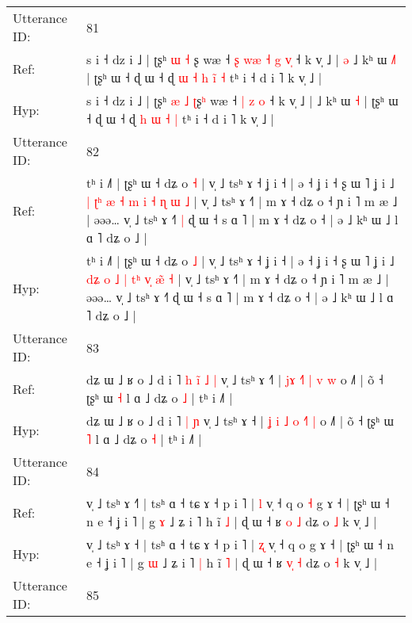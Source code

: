 \documentclass[10pt]{article}
\DeclareRobustCommand{\hl}[1]{{\textcolor{red}{#1}}}
\begin{document}
\begin{longtable}{ll}
 \\
\midrule
Utterance ID: & 81 \\
Ref: & s i ˧ dz i ˩ | ʈʂʰ \hl{ɯ} \hl{˧} \hl{}ʂ\hl{} wæ ˧\hl{ }\hl{ʂ}\hl{ }\hl{w}\hl{æ} \hl{˧} \hl{g} \hl{v}\hl{̩} ˧ k v̩ ˩ |\hl{ }\hl{ə} ˩ kʰ ɯ \hl{˩}\hl{˥} | ʈʂʰ ɯ ˧ ɖ ɯ ˧ ɖ\hl{ }\hl{ɯ} \hl{˧} \hl{h} \hl{i}\hl{̃} \hl{˧} tʰ i ˧ d i ˥ k v̩ ˩ |
 \\
Hyp: & s i ˧ dz i ˩ | ʈʂʰ \hl{æ} \hl{˩} \hl{ʈ}ʂ\hl{ʰ} wæ ˧\hl{}\hl{}\hl{}\hl{}\hl{} \hl{|} \hl{z} \hl{}\hl{o} ˧ k v̩ ˩ |\hl{}\hl{} ˩ kʰ ɯ \hl{}\hl{˧} | ʈʂʰ ɯ ˧ ɖ ɯ ˧ ɖ\hl{}\hl{} \hl{h} \hl{ɯ} \hl{}\hl{˧} \hl{|} tʰ i ˧ d i ˥ k v̩ ˩ |
 \\
\midrule
Utterance ID: & 82 \\
Ref: & tʰ i ˩˥ | ʈʂʰ ɯ ˧ dʑ o \hl{˧} | v̩ ˩ tsʰ ɤ ˧ ʝ i ˧ | ə ˧ ʝ i ˧ ʂ ɯ ˥ ʝ i ˩ \hl{|}\hl{ }\hl{ʈ}\hl{ʰ} \hl{æ} \hl{˧} \hl{m}\hl{ }\hl{i} \hl{˧}\hl{ }\hl{ɳ}\hl{ }\hl{ɯ} \hl{˩} | v̩ ˩ tsʰ ɤ ˧˥ | m ɤ ˧ dʑ o ˧ ɲ i ˥ m æ ˩ | əəə… v̩ ˩ tsʰ ɤ ˧˥\hl{ }\hl{|} ɖ ɯ ˧ s ɑ ˥ | m ɤ ˧ dʑ o ˧ | ə ˩ kʰ ɯ ˩ l ɑ ˥ dʑ o ˩ |
 \\
Hyp: & tʰ i ˩˥ | ʈʂʰ ɯ ˧ dʑ o \hl{˩} | v̩ ˩ tsʰ ɤ ˧ ʝ i ˧ | ə ˧ ʝ i ˧ ʂ ɯ ˥ ʝ i ˩ \hl{d}\hl{ʑ}\hl{ }\hl{o} \hl{˩} \hl{|} \hl{}\hl{t}\hl{ʰ} \hl{v}\hl{̩}\hl{ }\hl{æ}\hl{̃} \hl{˧} | v̩ ˩ tsʰ ɤ ˧˥ | m ɤ ˧ dʑ o ˧ ɲ i ˥ m æ ˩ | əəə… v̩ ˩ tsʰ ɤ ˧˥\hl{}\hl{} ɖ ɯ ˧ s ɑ ˥ | m ɤ ˧ dʑ o ˧ | ə ˩ kʰ ɯ ˩ l ɑ ˥ dʑ o ˩ |
 \\
\midrule
Utterance ID: & 83 \\
Ref: & dʑ ɯ ˩ ʁ o ˩ d i ˥\hl{ }\hl{h}\hl{ }\hl{i}\hl{̃} \hl{˩} \hl{|} v̩ ˩ tsʰ ɤ ˧\hl{˥} | \hl{j}\hl{ɤ}\hl{ }\hl{˧}\hl{˥} \hl{|} \hl{}\hl{v} \hl{w} o ˩˥ | õ ˧ ʈʂʰ ɯ \hl{˧} l ɑ ˩ dʑ o \hl{˩} | tʰ i ˩˥ |
 \\
Hyp: & dʑ ɯ ˩ ʁ o ˩ d i ˥\hl{}\hl{}\hl{}\hl{}\hl{} \hl{|} \hl{ɲ} v̩ ˩ tsʰ ɤ ˧\hl{} | \hl{ʝ}\hl{ }\hl{i}\hl{ }\hl{˩} \hl{o} \hl{˧}\hl{˥} \hl{|} o ˩˥ | õ ˧ ʈʂʰ ɯ \hl{˥} l ɑ ˩ dʑ o \hl{˧} | tʰ i ˩˥ |
 \\
\midrule
Utterance ID: & 84 \\
Ref: & v̩ ˩ tsʰ ɤ ˧\hl{˥} | tsʰ ɑ ˧ tɕ ɤ ˧ p i ˥ | \hl{l} v̩ ˧ q o\hl{ }\hl{˧} g ɤ ˧ | ʈʂʰ ɯ ˧ n e ˧ ʝ i ˥ | g \hl{ɤ} ˩ ʑ i ˥\hl{}\hl{} h ĩ \hl{˩} | ɖ ɯ ˧ ʁ \hl{}\hl{o} \hl{˩} dʑ o \hl{˩} k v̩ ˩ |
 \\
Hyp: & v̩ ˩ tsʰ ɤ ˧\hl{} | tsʰ ɑ ˧ tɕ ɤ ˧ p i ˥ | \hl{ʐ} v̩ ˧ q o\hl{}\hl{} g ɤ ˧ | ʈʂʰ ɯ ˧ n e ˧ ʝ i ˥ | g \hl{ɯ} ˩ ʑ i ˥\hl{ }\hl{|} h ĩ \hl{˥} | ɖ ɯ ˧ ʁ \hl{v}\hl{̩} \hl{˧} dʑ o \hl{˧} k v̩ ˩ |
 \\
\midrule
Utterance ID: & 85 \\

\end{longtable}
\end{document}
